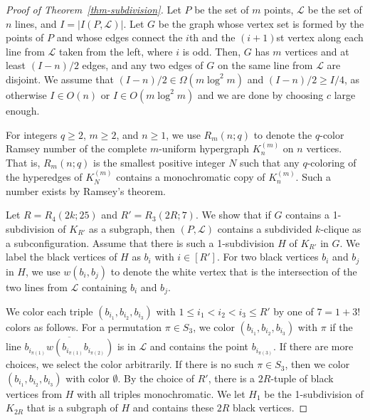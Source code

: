\documentclass{article}
\begin{document}
\begin{proof}[Proof of Theorem~\ref{thm-subdivision}]
Let $P$ be the set of $m$ points, $\mathcal{L}$ be the set of $n$ lines, and $I=|I(P,\mathcal{L})|$. 
Let $G$ be the graph whose vertex set is formed by the points of $P$ and whose edges connect the $i$th and the $(i+1)$st vertex along each line from $\mathcal{L}$ taken from the left, where $i$ is odd.
Then, $G$ has $m$ vertices and at least $(I-n)/2$ edges, and any two edges of $G$ on the same line from $\mathcal{L}$ are disjoint. 
We assume that $(I-n)/2 \in \Omega(m\log^2{m})$ and $(I-n)/2 \geq I/4$, as otherwise $I \in O(n)$ or $I \in O(m\log^2{m})$ and we are done by choosing $c$ large enough.

For integers $q \geq 2$, $m \geq 2$, and $n \geq 1$, we use $R_m(n;q)$ to denote the $q$-color Ramsey number of the complete $m$-uniform hypergraph $K^{(m)}_n$ on $n$ vertices.
That is, $R_m(n;q)$ is the smallest positive integer $N$ such that any $q$-coloring of the hyperedges of $K^{(m)}_N$ contains a monochromatic copy of $K^{(m)}_n$.
Such a number exists by Ramsey's theorem.

Let $R=R_4(2k;25)$ and $R' = R_3(2R;7)$. 
We show that if $G$ contains a 1-subdivision of $K_{R'}$ as a subgraph, then $(P,\mathcal{L})$ contains a subdivided $k$-clique as a subconfiguration.
Assume that there is such a 1-subdivision $H$ of $K_{R'}$ in $G$.
We label the black vertices of $H$ as $b_i$ with $i \in [R']$.
For two black vertices $b_i$ and $b_j$ in $H$, we use $w(b_i,b_j)$ to denote the white vertex that is the intersection of the two lines from $\mathcal{L}$ containing $b_i$ and $b_j$.

We color each triple $(b_{i_1},b_{i_2},b_{i_3})$ with $1 \leq i_1 < i_2 < i_3 \leq R'$ by one of $7=1+3!$ colors as follows.
For a permutation $\pi \in S_3$, we color $(b_{i_1},b_{i_2},b_{i_3})$ with $\pi$ if the line $\overline{b_{i_{\pi(1)}}w(b_{i_{\pi(1)}}b_{i_{\pi(2)}})}$ is in $\mathcal{L}$ and contains the point $b_{i_{\pi(3)}}$.
If there are more choices, we select the color arbitrarily.
If there is no such $\pi \in S_3$, then we color $(b_{i_1},b_{i_2},b_{i_3})$ with color $\emptyset$.
By the choice of $R'$, there is a $2R$-tuple of black vertices from $H$ with all triples monochromatic.
We let $H_1$ be the 1-subdivision of $K_{2R}$ that is a subgraph of $H$ and contains these $2R$ black vertices.


\end{proof}
\end{document}

